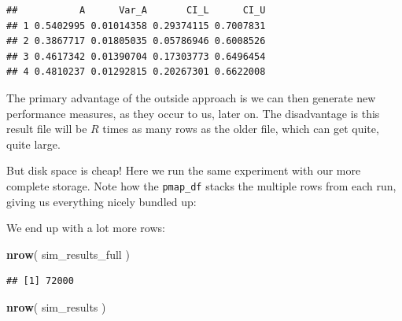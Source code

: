 \documentclass[
]{book}
\newenvironment{Shaded}{\begin{snugshade}}{\end{snugshade}}
\newcommand{\AttributeTok}[1]{\textcolor[rgb]{0.13,0.29,0.53}{#1}}
\newcommand{\DecValTok}[1]{\textcolor[rgb]{0.00,0.00,0.81}{#1}}
\newcommand{\FunctionTok}[1]{\textcolor[rgb]{0.13,0.29,0.53}{\textbf{#1}}}
\newcommand{\NormalTok}[1]{#1}
\newcommand{\OtherTok}[1]{\textcolor[rgb]{0.56,0.35,0.01}{#1}}
\newcommand{\SpecialCharTok}[1]{\textcolor[rgb]{0.81,0.36,0.00}{\textbf{#1}}}
\newcommand{\StringTok}[1]{\textcolor[rgb]{0.31,0.60,0.02}{#1}}
\begin{document}
\begin{verbatim}
##           A      Var_A       CI_L      CI_U
## 1 0.5402995 0.01014358 0.29374115 0.7007831
## 2 0.3867717 0.01805035 0.05786946 0.6008526
## 3 0.4617342 0.01390704 0.17303773 0.6496454
## 4 0.4810237 0.01292815 0.20267301 0.6622008
\end{verbatim}

The primary advantage of the outside approach is we can then generate new performance measures, as they
occur to us, later on.
The disadvantage is this result file will be \(R\) times as many rows as the older file, which can get quite, quite large.

But disk space is cheap!
Here we run the same experiment with our more complete storage.
Note how the \texttt{pmap\_df} stacks the multiple rows from each run, giving us everything nicely bundled up:

\begin{Shaded}
\end{Shaded}

We end up with a lot more rows:

\begin{Shaded}
\begin{Highlighting}[]
\FunctionTok{nrow}\NormalTok{( sim\_results\_full )}
\end{Highlighting}
\end{Shaded}

\begin{verbatim}
## [1] 72000
\end{verbatim}

\begin{Shaded}
\begin{Highlighting}[]
\FunctionTok{nrow}\NormalTok{( sim\_results )}
\end{Highlighting}
\end{Shaded}
\end{document}

